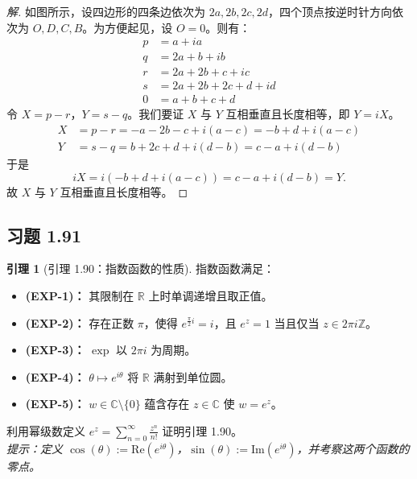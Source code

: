 \documentclass[11pt,a4paper]{article}
\theoremstyle{definition}
\newtheorem{lemma}[theorem]{引理}
\newenvironment{solution}{\begin{proof}[解]}{\end{proof}}
\begin{document}
\begin{solution}
如图所示，设四边形的四条边依次为 $2a, 2b, 2c, 2d$，四个顶点按逆时针方向依次为 $O, D, C, B$。为方便起见，设 $O = 0$。则有：
\[
  \begin{aligned}
    p &= a + ia \\
    q &= 2a + b + ib \\
    r &= 2a + 2b + c + ic \\
    s &= 2a + 2b + 2c + d + id \\
    0 &= a+b+c+d
  \end{aligned}
\]
令 $X = p - r$，$Y = s - q$。我们要证 $X$ 与 $Y$ 互相垂直且长度相等，即 $Y = iX$。
\[
  \begin{aligned}
    X &= p-r = -a - 2b - c + i(a - c) = -b+d+i(a-c) \\
    Y &= s-q = b + 2c + d + i (d - b) = c-a+i(d-b)
  \end{aligned}
\]
于是
\[
  iX = i(-b+d+i(a-c)) = c-a + i(d-b) = Y.
\]
故 $X$ 与 $Y$ 互相垂直且长度相等。
\end{solution}

\subsection{习题 1.91}

\begin{lemma}[引理 1.90：指数函数的性质]
  指数函数满足：
  \begin{itemize}
    \item \textbf{(EXP-1)：} 其限制在 $\mathbb{R}$ 上时单调递增且取正值。
    \item \textbf{(EXP-2)：} 存在正数 $\pi$，使得 $e^{\frac{\pi}{2} i} = i$，且 $e^z = 1$ 当且仅当 $z \in 2\pi i \mathbb{Z}$。
    \item \textbf{(EXP-3)：} $\exp$ 以 $2\pi i$ 为周期。
    \item \textbf{(EXP-4)：} $\theta \mapsto e^{i\theta}$ 将 $\mathbb{R}$ 满射到单位圆。
    \item \textbf{(EXP-5)：} $w \in \mathbb{C} \setminus \{0\}$ 蕴含存在 $z \in \mathbb{C}$ 使 $w = e^z$。
  \end{itemize}
\end{lemma}

利用幂级数定义 $e^z = \sum_{n=0}^{\infty} \frac{z^n}{n!}$ 证明引理 1.90。\\
\textit{提示：定义 $\cos(\theta) := \text{Re}(e^{i\theta})$，$\sin(\theta) := \text{Im}(e^{i\theta})$，并考察这两个函数的零点。}
\end{document}
